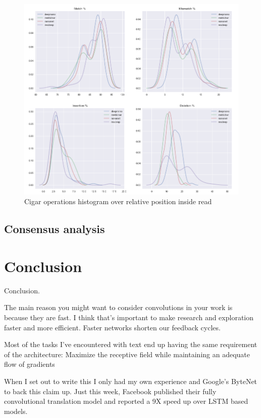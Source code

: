 \documentclass[times, utf8, diplomski, numeric, english]{fer}
\begin{document}
\begin{figure}[!ht]
	\begin{center}
		\includegraphics[width=1\textwidth]{./imgs/results/lambda/kde_cigar.png}
		\caption{Cigar operations histogram over relative position inside read}
		\label{fg:lambda_kde}
	\end{center}
\end{figure}
\section{Consensus analysis}

\chapter{Conclusion}
Conclusion.

The main reason you might want to consider convolutions in your work is because they are fast. I think that’s important to make research and exploration faster and more efficient. Faster networks shorten our feedback cycles.

Most of the tasks I’ve encountered with text end up having the same requirement of the architecture: Maximize the receptive field while maintaining an adequate flow of gradients

When I set out to write this I only had my own experience and Google’s ByteNet to back this claim up. Just this week, Facebook published their fully convolutional translation model and reported a 9X speed up over LSTM based models.
\end{document}
